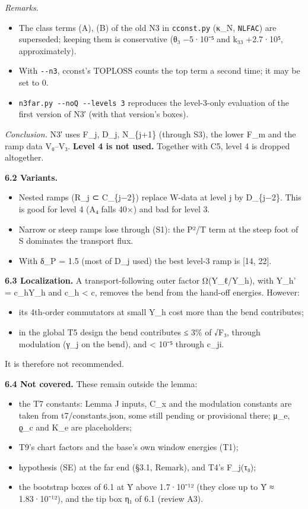 \documentclass[
]{article}
\providecommand{\tightlist}{%
  \setlength{\itemsep}{0pt}\setlength{\parskip}{0pt}}
\begin{document}
\emph{Remarks.}

\begin{itemize}
\tightlist
\item
  The class terms (A), (B) of the old N3 in \texttt{cconst.py} (κ\_N,
  \texttt{NLFAC}) are superseded; keeping them is conservative (θ₃
  −5·10⁻⁵ and k₃₃ +2.7·10⁵, approximately).
\item
  With \texttt{-\/-n3}, cconst's TOPLOSS counts the top term a second
  time; it may be set to 0.
\item
  \texttt{n3far.py\ -\/-noQ\ -\/-levels\ 3} reproduces the level-3-only
  evaluation of the first version of N3′ (with that version's boxes).
\end{itemize}

\emph{Conclusion.} N3′ uses F\_j, D\_j, N\_\{j+1\} (through S3), the
lower F\_m and the ramp data V₀--V₃. \textbf{Level 4 is not used.}
Together with C5, level 4 is dropped altogether.

\textbf{6.2 Variants.}

\begin{itemize}
\tightlist
\item
  Nested ramps (R\_j ⊂ C\_\{j−2\}) replace W-data at level j by
  D\_\{j−2\}. This is good for level 4 (A₄ falls 40×) and bad for level
  3.
\item
  Narrow or steep ramps lose through (S1): the P²/T term at the steep
  foot of S dominates the transport flux.
\item
  With δ\_P = 1.5 (most of D\_j used) the best level-3 ramp is {[}14,
  22{]}.
\end{itemize}

\textbf{6.3 Localization.} A transport-following outer factor
Ω(Y\_ℓ/Y\_h), with Y\_h' = c\_hY\_h and c\_h \textless{} c, removes the
bend from the hand-off energies. However:

\begin{itemize}
\tightlist
\item
  its 4th-order commutators at small Y\_h cost more than the bend
  contributes;
\item
  in the global T5 design the bend contributes ≤ 3\% of √F₃, through
  modulation (γ\_j on the bend), and \textless{} 10⁻⁵ through c\_ji.
\end{itemize}

It is therefore not recommended.

\textbf{6.4 Not covered.} These remain outside the lemma:

\begin{itemize}
\tightlist
\item
  the T7 constants: Lemma J inputs, C\_x and the modulation constants
  are taken from t7/constants.json, some still pending or provisional
  there; μ\_e, ϱ\_c and K\_e are placeholders;
\item
  T9's chart factors and the base's own window energies (T1);
\item
  hypothesis (SE) at the far end (§3.1, Remark), and T4's F\_j(τ₀);
\item
  the bootstrap boxes of 6.1 at Ȳ above 1.7·10⁻¹² (they close up to Ȳ ≈
  1.83·10⁻¹²), and the tip box η₁ of 6.1 (review A3).
\end{itemize}
\end{document}
